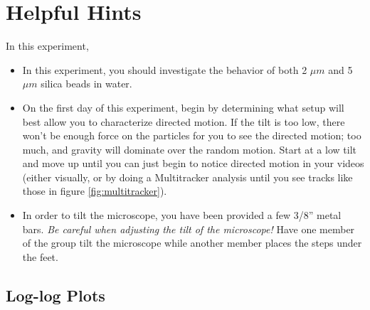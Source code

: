\section*{Helpful Hints}
In this experiment, 
\begin{itemize}
\item In this experiment, you should investigate the behavior of both 2 $\mu m$ and 5 $\mu m$ silica beads in water.
\item On the first day of this experiment, begin by determining what setup will best allow you to characterize directed motion. If the tilt is too low, there won't be enough force on the particles for you to see the directed motion; too much, and gravity will dominate over the random motion. Start at a low tilt and move up until you can just begin to notice directed motion in your videos (either visually, or by doing a Multitracker analysis until you see tracks like those in figure \ref{fig:multitracker}).
\item In order to tilt the microscope, you have been provided a few 3/8'' metal bars. \emph{Be careful when adjusting the tilt of the microscope!} Have one member of the group tilt the microscope while another member places the steps under the feet.
\end{itemize}

\subsection*{Log-log Plots}

